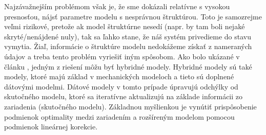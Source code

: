 Najzávažnejším problémom však je, že sme dokázali relatívne s vysokou presnosťou, nájsť parametre modelu s nesprávnou štruktúrou. Toto je samozrejme veľmi rizikové, pretože ak model štruktúrne nesedí (napr. by tam boli nejaké skryté/nenájdené nuly), tak sa ľahko stane, že náš systém privedieme do stavu vymytia. Žiaľ, informácie o štruktúre modelu nedokážeme získať z nameraných údajov a treba tento problém vyriešiť iným spôsobom. Ako bolo ukázané v článku \cite{HERNANDEZ201946}, jedným z riešení môžu byť hybridné modely. Hybridné modely sú také modely, ktoré majú základ v mechanických modeloch a tieto sú doplnené dátovými modelmi. Dátové modely v tomto prípade úpravujú odchýlky od skutočného modelu, ktoré sa iteratívne aktualizujú na základe informácii zo zariadenia (skutočného modelu). Základnou myšlienkou je vynútiť prispôsobenie podmienok optimality medzi zariadením a rozšíreným modelom pomocou podmienok lineárnej korekcie.
